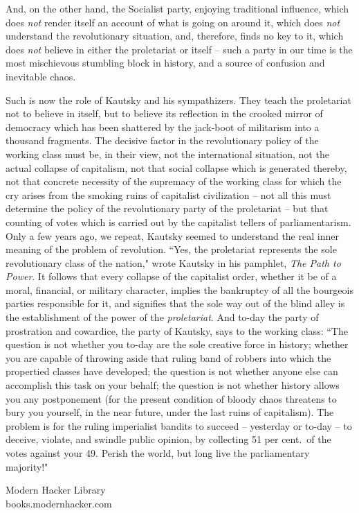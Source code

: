 \documentclass[12pt]{article}
\begin{document}
\vspace{12pt}
And, on the other hand, the Socialist party, enjoying traditional
influence, which does \emph{not} render itself an account of what is going
on around it, which does \emph{not} understand the revolutionary situation,
and, therefore, finds no key to it, which does \emph{not} believe in either
the proletariat or itself -- such a party in our time is the most
mischievous stumbling block in history, and a source of confusion and
inevitable chaos.

\vspace{12pt}
Such is now the role of Kautsky and his sympathizers. They teach the
proletariat not to believe in itself, but to believe its reflection in
the crooked mirror of democracy which has been shattered by the
jack-boot of militarism into a thousand fragments. The decisive factor
in the revolutionary policy of the working class must be, in their
view, not the international situation, not the actual collapse of
capitalism, not that social collapse which is generated thereby, not
that concrete necessity of the supremacy of the working class for
which the cry arises from the smoking ruins of capitalist
civilization -- not all this must determine the policy of the
revolutionary party of the proletariat -- but that counting of votes
which is carried out by the capitalist tellers of parliamentarism.
Only a few years ago, we repeat, Kautsky seemed to understand the real
inner meaning of the problem of revolution. ``Yes, the proletariat
represents the sole revolutionary class of the nation," wrote Kautsky
in his pamphlet, \emph{The Path to Power}. It follows that every collapse
of the capitalist order, whether it be of a moral, financial, or
military character, implies the bankruptcy of all the bourgeois
parties responsible for it, and signifies that the sole way out of the
blind alley is the establishment of the power of the \emph{proletariat}.
And to-day the party of prostration and cowardice, the party of
Kautsky, says to the working class: ``The question is not whether you
to-day are the sole creative force in history; whether you are capable
of throwing aside that ruling band of robbers into which the
propertied classes have developed; the question is not whether anyone
else can accomplish this task on your behalf; the question is not
whether history allows you any postponement (for the present condition
of bloody chaos threatens to bury you yourself, in the near future,
under the last ruins of capitalism). The problem is for the ruling
imperialist bandits to succeed -- yesterday or to-day -- to deceive,
violate, and swindle public opinion, by collecting 51 per cent.\ of the
votes against your 49. Perish the world, but long live the
parliamentary majority!"






\vfill
\begin{center}
{\selectfont 
Modern Hacker Library\\books.modernhacker.com}
\end{center}
\end{document}
